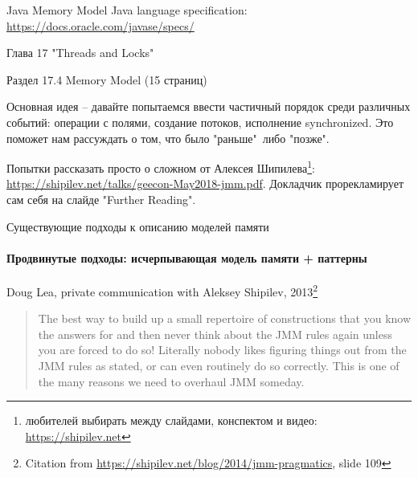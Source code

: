 \begin{frame}[t,noframenumbering]{Java Memory Model}
Java language specification: \url{https://docs.oracle.com/javase/specs/}

Глава 17 "Threads and Locks"

Раздел 17.4 Memory Model (15 страниц)

Основная идея -- давайте попытаемся ввести частичный порядок среди различных событий: операции с полями, создание потоков, исполнение synchronized.
Это поможет нам рассуждать о том, что было "раньше"\ либо "позже".


Попытки рассказать просто о сложном от Алексея Шипилева\footnote{ любителей выбирать между слайдами, конспектом и видео: \url{https://shipilev.net}}: \url{https://shipilev.net/talks/geecon-May2018-jmm.pdf}. Докладчик прорекламирует сам себя на слайде "Further Reading".

\end{frame}


\begin{frame}{Существующие подходы к описанию моделей памяти}
\framesubtitle{Продвинутые подходы: исчерпывающая модель памяти + паттерны}

Doug Lea, private communication with Aleksey Shipilev, 2013\footnote{\tiny Citation from \url{https://shipilev.net/blog/2014/jmm-pragmatics}, slide 109}

\begin{quote}
The best way to build up a small repertoire of constructions that you know the answers for and then never think about the JMM rules again unless you are forced to do so! Literally nobody likes figuring things out from the JMM rules as stated, or can even routinely do so correctly.
This is one of the many reasons we need to overhaul JMM someday.
\end{quote}
\end{frame}


